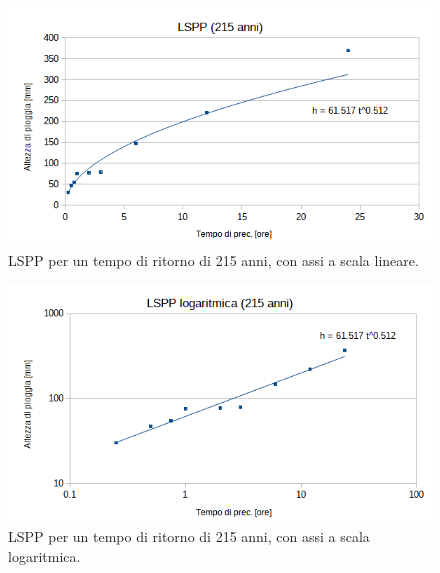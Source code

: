 \begin{figure}[H]\centering
    \includegraphics[scale=0.75]{immagini/LSPP_215.png}
    \caption{LSPP per un tempo di ritorno di 215 anni, con assi a scala lineare.}
\end{figure}

\begin{figure}[H]\centering
    \includegraphics[scale=0.75]{immagini/LSPP_log_215.png}
    \caption{LSPP per un tempo di ritorno di 215 anni, con assi a scala logaritmica.}
\end{figure}

